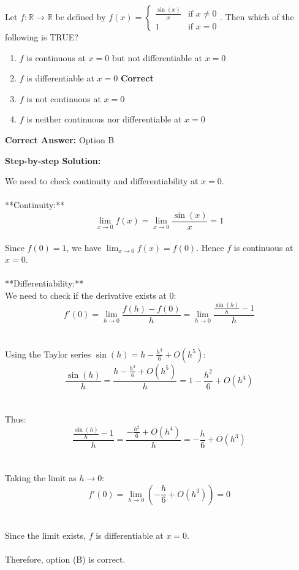 \documentclass[11pt]{article}
\begin{document}
Let \(f: \mathbb{R} \to \mathbb{R}\) be defined by \(f(x) = \begin{cases} \frac{\sin(x)}{x} & \text{if } x \neq 0 \\ 1 & \text{if } x = 0 \end{cases}\). Then which of the following is TRUE?


\begin{enumerate}[label=\textbf{\Alph*.}, leftmargin=1.8em]
\item \(f\) is continuous at \(x = 0\) but not differentiable at \(x = 0\)\item \(f\) is differentiable at \(x = 0\) \hfill {\color{gategreen}\textbf{Correct}}\item \(f\) is not continuous at \(x = 0\)\item \(f\) is neither continuous nor differentiable at \(x = 0\)\end{enumerate}

\textbf{Correct Answer:} Option B

\textbf{Step-by-step Solution:}

We need to check continuity and differentiability at \(x = 0\).\\
\\
**Continuity:**\\
\[\lim_{x \to 0} f(x) = \lim_{x \to 0} \frac{\sin(x)}{x} = 1\]\\
Since \(f(0) = 1\), we have \(\lim_{x \to 0} f(x) = f(0)\). Hence \(f\) is continuous at \(x = 0\).\\
\\
**Differentiability:**\\
We need to check if the derivative exists at \(0\):\\
\[f'(0) = \lim_{h \to 0} \frac{f(h) - f(0)}{h} = \lim_{h \to 0} \frac{\frac{\sin(h)}{h} - 1}{h}\]\\
\\
Using the Taylor series \(\sin(h) = h - \frac{h^3}{6} + O(h^5)\):\\
\[\frac{\sin(h)}{h} = \frac{h - \frac{h^3}{6} + O(h^5)}{h} = 1 - \frac{h^2}{6} + O(h^4)\]\\
\\
Thus:\\
\[\frac{\frac{\sin(h)}{h} - 1}{h} = \frac{-\frac{h^2}{6} + O(h^4)}{h} = -\frac{h}{6} + O(h^3)\]\\
\\
Taking the limit as \(h \to 0\):\\
\[f'(0) = \lim_{h \to 0} \left(-\frac{h}{6} + O(h^3)\right) = 0\]\\
\\
Since the limit exists, \(f\) is differentiable at \(x = 0\).\\
\\
Therefore, option (B) is correct.
\end{document}
